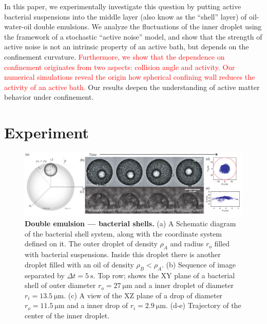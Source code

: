 \documentclass[%
10pt,
superscriptaddress,
twocolumn,
 amsmath,amssymb,
 aps,prx,
]{revtex4-2}
\begin{document}
In this paper, we experimentally investigate this question by putting active bacterial suspensions into the middle layer (also know as the ``shell'' layer) of oil-water-oil double emulsions.
We analyze the fluctuations of the inner droplet using the framework of a stochastic ``active noise'' model, and show that the strength of active noise is not an intrinsic property of an active bath, but depends on the confinement curvature.
\textcolor{red}{Furthermore, we show that the dependence on confinement originates from two aspects: collision angle and activity. Our numerical simulations reveal the origin how spherical confining wall reduces the activity of an active bath.}
Our results deepen the understanding of active matter behavior under confinement.

\section{Experiment}

\begin{figure}[!t]
  \includegraphics[width=\textwidth]{Diagrama_DE}
  \caption{
  \textbf{Double emulsion --- bacterial shells.}
  (a) A Schematic diagram of the bacterial shell system, along with the coordinate system defined on it.
  The outer droplet of density $\rho_A$ and radius $r_o$ filled with bacterial suspensions.
  Inside this droplet there is another droplet filled with an oil of density $\rho_B < \rho_A$.
  (b) Sequence of image separated by $\Delta t =\SI{5}{\second}$. Top row; shows the XY plane of a bacterial shell of outer diameter $r_o=\SI{27}{\micro\meter}$ and a inner droplet of diameter $r_i=\SI{13.5}{\micro\meter}$.
  (c) A view of the XZ plane of a drop of diameter $r_o=\SI{11.5}{\micro\meter}$ and a inner drop of $r_i=\SI{2.9}{\micro\meter}$.
  (d-e) Trajectory of the center of the inner droplet.
  }
  \label{montaje_doble}
\end{figure}
\end{document}
